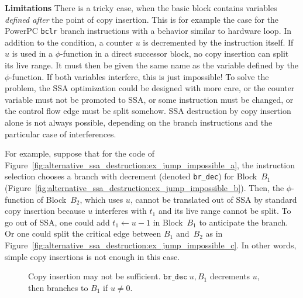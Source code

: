 {\bf Limitations}
There is a  tricky case, when the basic block contains variables
\emph{defined after} the point of copy insertion. This is for example the case for the PowerPC
\texttt{bclr} branch instructions with a behavior similar to hardware loop. In
addition to the condition, a counter $u$ is decremented by the instruction
itself. If $u$ is used in a $\phi$-function in a direct successor block, no
copy insertion can split its live range. It must then be given the same name as
the variable defined by the $\phi$-function. If both variables interfere, this
is just impossible! To solve the problem, the SSA optimization could be
designed with more care, or the counter variable must not be promoted to SSA,
or some instruction must be changed, or the control flow edge must be split
somehow.  SSA destruction by
copy insertion alone is not always possible, depending on the branch
instructions and the particular case of interferences.

For example, suppose that for the code of
Figure~\ref{fig:alternative_ssa_destruction:ex_jump_impossible_a}, the instruction selection chooses a branch
with decrement (denoted \texttt{br\_dec}) for Block~$B_1$
(Figure~\ref{fig:alternative_ssa_destruction:ex_jump_impossible_b}).  Then, the $\phi$-function of
Block~$B_2$, which uses $u$, cannot be translated out of SSA by standard copy
insertion because $u$ interferes with $t_1$ and its live range cannot be split.
To go out of SSA, one could add $t_1\gets u-1$ in Block~$B_1$ to anticipate the
branch. Or one could split the critical edge between $B_1$ and~$B_2$ as in
Figure~\ref{fig:alternative_ssa_destruction:ex_jump_impossible_c}. In other words, simple copy insertions is not enough in this case.

\begin{figure}[h]
\hfill
{}
\hfill
{}
\caption{Copy insertion may not be sufficient. $\texttt{br\_dec}\ u,B_1$ decrements $u$, then branches to $B_1$ if $u\neq 0$.\label{fig:alternative_ssa_destruction:ex_jump_impossible}}
\end{figure}

